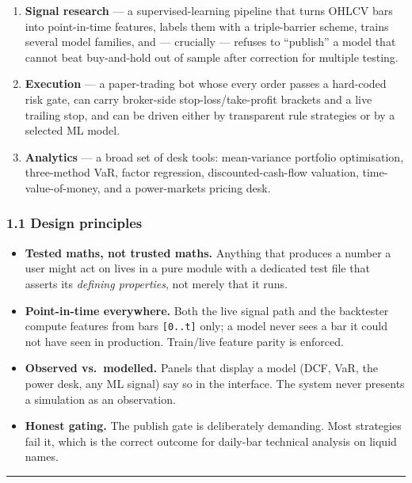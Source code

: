 \documentclass[
  11pt,
]{article}
\providecommand{\tightlist}{%
  \setlength{\itemsep}{0pt}\setlength{\parskip}{0pt}}
\begin{document}
\begin{enumerate}
\def\labelenumi{\arabic{enumi}.}
\item
  \textbf{Signal research} --- a supervised-learning pipeline that turns
  OHLCV bars into point-in-time features, labels them with a
  triple-barrier scheme, trains several model families, and ---
  crucially --- refuses to ``publish'' a model that cannot beat
  buy-and-hold out of sample after correction for multiple testing.
\item
  \textbf{Execution} --- a paper-trading bot whose every order passes a
  hard-coded risk gate, can carry broker-side stop-loss/take-profit
  brackets and a live trailing stop, and can be driven either by
  transparent rule strategies or by a selected ML model.
\item
  \textbf{Analytics} --- a broad set of desk tools: mean-variance
  portfolio optimisation, three-method VaR, factor regression,
  discounted-cash-flow valuation, time-value-of-money, and a
  power-markets pricing desk.
\end{enumerate}

\subsubsection{1.1 Design principles}\label{design-principles}

\begin{itemize}
\tightlist
\item
  \textbf{Tested maths, not trusted maths.} Anything that produces a
  number a user might act on lives in a pure module with a dedicated
  test file that asserts its \emph{defining properties}, not merely that
  it runs.
\item
  \textbf{Point-in-time everywhere.} Both the live signal path and the
  backtester compute features from bars \texttt{{[}0..t{]}} only; a
  model never sees a bar it could not have seen in production.
  Train/live feature parity is enforced.
\item
  \textbf{Observed vs.~modelled.} Panels that display a model (DCF, VaR,
  the power desk, any ML signal) say so in the interface. The system
  never presents a simulation as an observation.
\item
  \textbf{Honest gating.} The publish gate is deliberately demanding.
  Most strategies fail it, which is the correct outcome for daily-bar
  technical analysis on liquid names.
\end{itemize}

\begin{center}\rule{0.5\linewidth}{0.5pt}\end{center}
\end{document}
